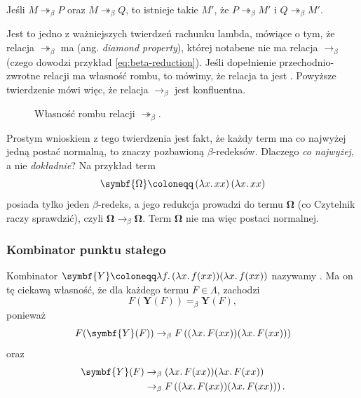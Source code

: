 \documentclass[polish,pretty,bibliography=totocnumbered]{angav}
\newcommand{\toto}{\twoheadrightarrow}
\begin{document}
\begin{theorem}
    Jeśli $M \toto_\beta P$ oraz $M \toto_\beta Q$, to istnieje takie $M'$, że $P \toto_\beta M'$ i $Q \toto_\beta M'$.
\end{theorem}

Jest to jedno z ważniejszych twierdzeń rachunku lambda, mówiące o tym, że relacja $\toto_\beta$ ma  (ang. \textit{diamond property}), której notabene nie ma relacja $\to_\beta$ (czego dowodzi przykład \ref{eq:beta-reduction}). Jeśli dopełnienie przechodnio-zwrotne relacji ma własność rombu, to mówimy, że relacja ta jest . Powyższe twierdzenie mówi więc, że relacja $\to_\beta$ jest konfluentna.

\begin{figure}[H]
    \centering
    \caption{Własność rombu relacji $\toto_\beta$.}
    \label{fig:church-rosser}
\end{figure}

Prostym wnioskiem z tego twierdzenia jest fakt, że każdy term ma co najwyżej jedną postać normalną, to znaczy pozbawioną $\beta$-redeksów.
Dlaczego \emph{co najwyżej}, a nie \emph{dokładnie}? Na przykład term
\[ \symbf{\Omega} \coloneqq \left(\lambda x\ldotp xx\right)\left(\lambda x\ldotp xx\right) \]
posiada tylko jeden $\beta$-redeks, a jego redukcja prowadzi do termu $\symbf{\Omega}$ (co Czytelnik raczy sprawdzić), czyli $\symbf{\Omega} \to_\beta \symbf{\Omega}$. Term $\symbf{\Omega}$ nie ma więc postaci normalnej.

\subsubsection{Kombinator punktu stałego}
Kombinator $\symbf{Y} \coloneqq \lambda f\ldotp (\lambda x\ldotp f (xx)) (\lambda x\ldotp f (xx))$ nazywamy . Ma on tę ciekawą własność, że dla każdego termu $F \in \Lambda$, zachodzi
\[ F(\symbf{Y}(F)) =_\beta \symbf{Y}(F), \]
ponieważ
\[ F(\symbf{Y}(F)) \to_\beta F\left((\lambda x\ldotp F (xx)) (\lambda x\ldotp F (xx))\right) \]
oraz
\begin{align*}
    \symbf{Y}(F) &\to_\beta (\lambda x\ldotp F (xx)) (\lambda x\ldotp F (xx)) \\
    &\to_\beta F\left((\lambda x\ldotp F (xx)) (\lambda x\ldotp F (xx))\right).
\end{align*}
\end{document}

